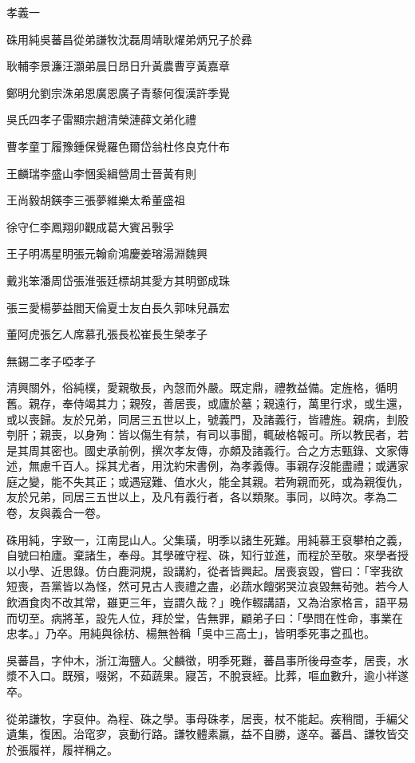 
\begin{pinyinscope}
孝義一

硃用純吳蕃昌從弟謙牧沈磊周靖耿燿弟炳兄子於彞

耿輔李景濂汪灝弟晨日昂日升黃農曹亨黃嘉章

鄭明允劉宗洙弟恩廣恩廣子青藜何復漢許季覺

吳氏四孝子雷顯宗趙清榮漣薛文弟化禮

曹孝童丁履豫鍾保覺羅色爾岱翁杜佟良克什布

王麟瑞李盛山李悃奚緝營周士晉黃有則

王尚毅胡鍈李三張夢維樂太希董盛祖

徐守仁李鳳翔卯觀成葛大賓呂斅孚

王子明馮星明張元翰俞鴻慶姜瑢湯淵魏興

戴兆笨潘周岱張淮張廷標胡其愛方其明鄧成珠

張三愛楊夢益閻天倫夏士友白長久郭味兒聶宏

董阿虎張乞人席慕孔張長松崔長生榮孝子

無錫二孝子啞孝子

清興關外，俗純樸，愛親敬長，內愨而外嚴。既定鼎，禮教益備。定旌格，循明舊。親存，奉侍竭其力；親歿，善居喪，或廬於墓；親遠行，萬里行求，或生還，或以喪歸。友於兄弟，同居三五世以上，號義門，及諸義行，皆禮旌。親病，刲股刳肝；親喪，以身殉：皆以傷生有禁，有司以事聞，輒破格報可。所以教民者，若是其周其密也。國史承前例，撰次孝友傳，亦頗及諸義行。合之方志甄錄、文家傳述，無慮千百人。採其尤者，用沈約宋書例，為孝義傳。事親存沒能盡禮；或遘家庭之變，能不失其正；或遇寇難、值水火，能全其親。若殉親而死，或為親復仇，友於兄弟，同居三五世以上，及凡有義行者，各以類聚。事同，以時次。孝為二卷，友與義合一卷。

硃用純，字致一，江南昆山人。父集璜，明季以諸生死難。用純慕王裒攀柏之義，自號曰柏廬。棄諸生，奉母。其學確守程、硃，知行並進，而程於至敬。來學者授以小學、近思錄。仿白鹿洞規，設講約，從者皆興起。居喪哀毀，嘗曰：「宰我欲短喪，吾黨皆以為怪，然可見古人喪禮之盡，必蔬水饘粥哭泣哀毀無茍弛。若今人飲酒食肉不改其常，雖更三年，豈謂久哉？」晚作輟講語，又為治家格言，語平易而切至。病將革，設先人位，拜於堂，告無罪，顧弟子曰：「學問在性命，事業在忠孝。」乃卒。用純與徐枋、楊無咎稱「吳中三高士」，皆明季死事之孤也。

吳蕃昌，字仲木，浙江海鹽人。父麟徵，明季死難，蕃昌事所後母查孝，居喪，水漿不入口。既殯，啜粥，不茹蔬果。寢苫，不脫衰絰。比葬，嘔血數升，逾小祥遂卒。

從弟謙牧，字裒仲。為程、硃之學。事母硃孝，居喪，杖不能起。疾稍間，手編父遺集，復困。治窀穸，哀動行路。謙牧體素羸，益不自勝，遂卒。蕃昌、謙牧皆交於張履祥，履祥稱之。


\end{pinyinscope}

